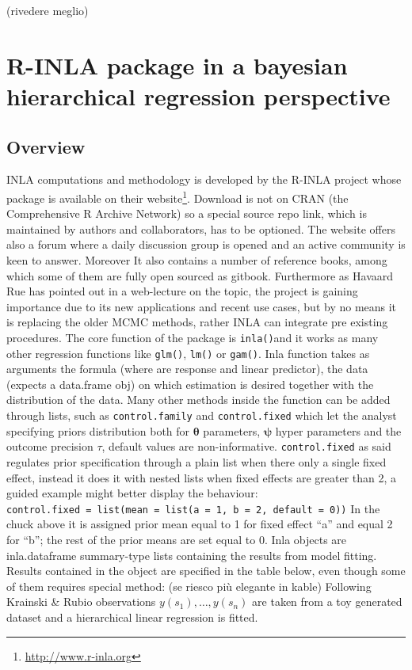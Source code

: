 \documentclass[
  12pt,
  a4paper,
  oneside]{book}
\DeclareRobustCommand{\href}[2]{#2\footnote{\url{#1}}}
\theoremstyle{definition}
\theoremstyle{definition}
\theoremstyle{definition}
\theoremstyle{remark}
\begin{document}
(rivedere meglio)

\hypertarget{rinla}{%
\section{R-INLA package in a bayesian hierarchical regression perspective}\label{rinla}}

\hypertarget{overview}{%
\subsection{Overview}\label{overview}}

INLA computations and methodology is developed by the R-INLA project whose package is available on their \href{http://www.r-inla.org}{website}. Download is not on CRAN (the Comprehensive R Archive Network) so a special source repo link, which is maintained by authors and collaborators, has to be optioned. The website offers also a forum where a daily discussion group is opened and an active community is keen to answer. Moreover It also contains a number of reference books, among which some of them are fully open sourced as gitbook. Furthermore as Havaard Rue has pointed out in a web-lecture on the topic, the project is gaining importance due to its new applications and recent use cases, but by no means it is replacing the older MCMC methods, rather INLA can integrate pre existing procedures.
The core function of the package is \texttt{inla()}and it works as many other regression functions like \texttt{glm()}, \texttt{lm()} or \texttt{gam()}. Inla function takes as arguments the formula (where are response and linear predictor), the data (expects a data.frame obj) on which estimation is desired together with the distribution of the data. Many other methods inside the function can be added through lists, such as \texttt{control.family} and \texttt{control.fixed} which let the analyst specifying priors distribution both for \(\boldsymbol{\theta}\) parameters, \(\boldsymbol{\psi}\) hyper parameters and the outcome precision \(\tau\), default values are non-informative.
\texttt{control.fixed} as said regulates prior specification through a plain list when there only a single fixed effect, instead it does it with nested lists when fixed effects are greater than 2, a guided example might better display the behaviour:
\texttt{control.fixed\ =\ list(mean\ =\ list(a\ =\ 1,\ b\ =\ 2,\ default\ =\ 0))}
In the chuck above it is assigned prior mean equal to 1 for fixed effect ``a'' and equal 2 for ``b''; the rest of the prior means are set equal to 0.
Inla objects are inla.dataframe summary-type lists containing the results from model fitting. Results contained in the object are specified in the table below, even though some of them requires special method: (se riesco più elegante in kable)
Following Krainski \& Rubio \citeyearpar{Krainski-Rubio} observations \(y(s_{1}), \ldots, y(s_{n})\) are taken from a toy generated dataset and a hierarchical linear regression is fitted.
\end{document}
